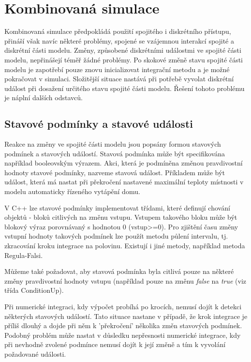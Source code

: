 \documentclass[a4paper]{article}
\begin{document}
\section{Kombinovaná simulace}

Kombinovaná simulace předpokládá použití spojitého i diskrétního
přístupu, přináší však navíc některé problémy, spojené se
vzájemnou interakcí spojité a diskrétní části modelu. Změny,
způsobené diskrétními událostmi ve spojité části modelu,
nepřinášejí téměř žádné problémy. Po skokové změně stavu spojité
části modelu je zapotřebí pouze znovu inicializovat integrační
metodu a je možné pokračovat v simulaci. Složitější situace
nastává při potřebě vyvolat diskrétní událost při dosažení
určitého stavu spojité části modelu. Řešení tohoto problému je
náplní dalších odstavců.


\subsection{Stavové podmínky a stavové události}

Reakce na změny ve spojité části modelu jsou popsány formou
stavových podmínek a stavových událostí. Stavová podmínka může
být specifikována například booleovským výrazem. Akci, která je
podmíněna změnou pravdivostní hodnoty stavové podmínky, nazveme
stavová událost. Příkladem může být událost, která má nastat při
překročení nastavené maximální teploty místnosti v modelu
automaticky řízeného vytápění domu.

V C++ lze stavové podmínky implementovat třídami, které definují
chování objektů - bloků citlivých na změnu vstupu. Vstupem
takového bloku může být blokový výraz porovnávaný s hodnotou 0
(vstup>=0).
 Pro zjištění času
změny vstupní hodnoty takových podmínek lze použít 
metodu půlení intervalu, tj. zkracování kroku integrace na
polovinu. Existují i jiné metody, například metoda
Regula-Falsi.

Můžeme také požadovat, aby stavová podmínka byla citlivá pouze
na některé změny pravdivostní hodnoty vstupu (například pouze na
změnu \emph{false} na \emph{true} (viz třída ConditionUp).

Při numerické integraci, kdy výpočet probíhá po krocích, nemusí
dojít k detekci některých stavových událostí. Tato situace
nastane v případě, že krok integrace je příliš dlouhý a dojde
při něm k 'překročení' několika změn stavových podmínek. Podobný
problém může nastat v důsledku nepřesnosti numerické integrace,
kdy při nevhodně zvolené podmínce nemusí dojít k její změně
a tím k vyvolání požadované události.
\end{document}
